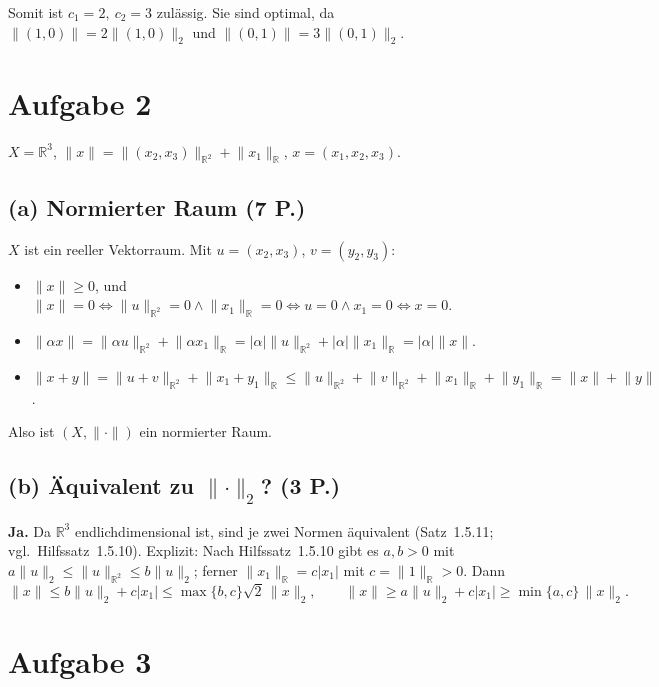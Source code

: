 \documentclass[11pt,a4paper]{article}
\newcommand{\R}{\mathbb{R}}
\newcommand{\norm}[1]{\lVert #1 \rVert}
\newcommand{\abs}[1]{\lvert #1 \rvert}
\newcommand{\nz}{\norm{\cdot}_2}
\begin{document}
Somit ist $\boxed{c_1=2,\ c_2=3}$ zulässig. Sie sind optimal, da
$\norm{(1,0)}=2\norm{(1,0)}_2$ und $\norm{(0,1)}=3\norm{(0,1)}_2$.

\section*{Aufgabe 2}

\noindent
$X=\R^3$, $\norm{x}=\norm{(x_2,x_3)}_{\R^2}+\norm{x_1}_{\R}$, $x=(x_1,x_2,x_3)$.

\subsection*{(a) Normierter Raum \hfill (7 P.)}
$X$ ist ein reeller Vektorraum. Mit $u=(x_2,x_3)$, $v=(y_2,y_3)$:
\begin{itemize}[leftmargin=1.6em,itemsep=1pt]
\item $\norm{x}\ge0$, und
$\norm{x}=0\Leftrightarrow\norm{u}_{\R^2}=0\wedge\norm{x_1}_{\R}=0
\Leftrightarrow u=0\wedge x_1=0\Leftrightarrow x=0$.
\item $\norm{\alpha x}=\norm{\alpha u}_{\R^2}+\norm{\alpha x_1}_{\R}
=\abs{\alpha}\norm{u}_{\R^2}+\abs{\alpha}\norm{x_1}_{\R}=\abs{\alpha}\norm{x}$.
\item $\norm{x+y}=\norm{u+v}_{\R^2}+\norm{x_1+y_1}_{\R}
\le\norm{u}_{\R^2}+\norm{v}_{\R^2}+\norm{x_1}_{\R}+\norm{y_1}_{\R}=\norm{x}+\norm{y}$.
\end{itemize}
Also ist $(X,\norm{\cdot})$ ein normierter Raum.

\subsection*{(b) Äquivalent zu $\nz$? \hfill (3 P.)}
\textbf{Ja.} Da $\R^3$ endlichdimensional ist, sind je zwei Normen äquivalent
(Satz~1.5.11; vgl.\ Hilfssatz~1.5.10). Explizit: Nach Hilfssatz~1.5.10 gibt es
$a,b>0$ mit $a\norm{u}_2\le\norm{u}_{\R^2}\le b\norm{u}_2$; ferner
$\norm{x_1}_{\R}=c\abs{x_1}$ mit $c=\norm{1}_{\R}>0$. Dann
\[
  \norm{x}\le b\norm{u}_2+c\abs{x_1}\le\max\{b,c\}\sqrt2\,\norm{x}_2,
  \qquad
  \norm{x}\ge a\norm{u}_2+c\abs{x_1}\ge\min\{a,c\}\,\norm{x}_2 .
\]

\section*{Aufgabe 3}
\end{document}
